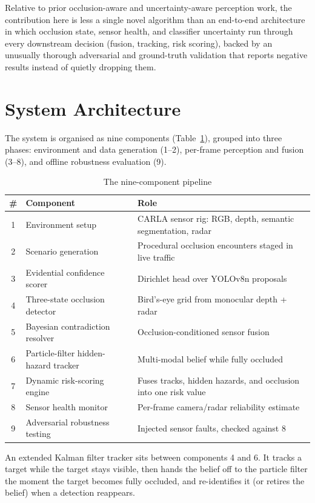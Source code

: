 \documentclass[conference]{IEEEtran}
\begin{document}
Relative to prior occlusion-aware and uncertainty-aware perception
work, the contribution here is less a single novel algorithm than an
end-to-end architecture in which occlusion state, sensor health, and
classifier uncertainty run through every downstream decision (fusion,
tracking, risk scoring), backed by an unusually thorough adversarial
and ground-truth validation that reports negative results instead of
quietly dropping them.

\section{System Architecture}
\label{sec:architecture}

The system is organised as nine components (Table~\ref{tab:components}),
grouped into three phases: environment and data generation (1--2),
per-frame perception and fusion (3--8), and offline robustness
evaluation (9).

\begin{table}[htbp]
\caption{The nine-component pipeline}
\label{tab:components}
\centering
\begin{tabular}{@{}clp{4.3cm}@{}}
\toprule
\# & Component & Role \\
\midrule
1 & Environment setup & CARLA sensor rig: RGB, depth, semantic segmentation, radar \\
2 & Scenario generation & Procedural occlusion encounters staged in live traffic \\
3 & Evidential confidence scorer & Dirichlet head over YOLOv8n proposals \\
4 & Three-state occlusion detector & Bird's-eye grid from monocular depth + radar \\
5 & Bayesian contradiction resolver & Occlusion-conditioned sensor fusion \\
6 & Particle-filter hidden-hazard tracker & Multi-modal belief while fully occluded \\
7 & Dynamic risk-scoring engine & Fuses tracks, hidden hazards, and occlusion into one risk value \\
8 & Sensor health monitor & Per-frame camera/radar reliability estimate \\
9 & Adversarial robustness testing & Injected sensor faults, checked against 8 \\
\bottomrule
\end{tabular}
\end{table}

An extended Kalman filter tracker sits between components 4 and 6. It
tracks a target while the target stays visible, then hands the belief
off to the particle filter the moment the target becomes fully
occluded, and re-identifies it (or retires the belief) when a
detection reappears.
\end{document}
